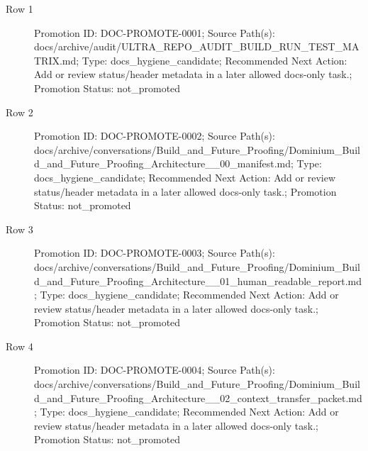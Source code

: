 \documentclass[9pt,a4paper,openany]{book}
\begin{document}
\begin{description}
\item[Row 1] Promotion ID: DOC-\allowbreak{}PROMOTE-\allowbreak{}0001; Source Path(s): docs/\allowbreak{}archive/\allowbreak{}audit/\allowbreak{}ULTRA\_\allowbreak{}REPO\_\allowbreak{}AUDIT\_\allowbreak{}BUILD\_\allowbreak{}RUN\_\allowbreak{}TEST\_\allowbreak{}MATRIX.\allowbreak{}md; Type: docs\_\allowbreak{}hygiene\_\allowbreak{}candidate; Recommended Next Action: Add or review status/\allowbreak{}header metadata in a later allowed docs-\allowbreak{}only task.\allowbreak{}; Promotion Status: not\_\allowbreak{}promoted
\item[Row 2] Promotion ID: DOC-\allowbreak{}PROMOTE-\allowbreak{}0002; Source Path(s): docs/\allowbreak{}archive/\allowbreak{}conversations/\allowbreak{}Build\_\allowbreak{}and\_\allowbreak{}Future\_\allowbreak{}Proofing/\allowbreak{}Dominium\_\allowbreak{}Build\_\allowbreak{}and\_\allowbreak{}Future\_\allowbreak{}Proofing\_\allowbreak{}Architecture\_\allowbreak{}\_\allowbreak{}00\_\allowbreak{}manifest.\allowbreak{}md; Type: docs\_\allowbreak{}hygiene\_\allowbreak{}candidate; Recommended Next Action: Add or review status/\allowbreak{}header metadata in a later allowed docs-\allowbreak{}only task.\allowbreak{}; Promotion Status: not\_\allowbreak{}promoted
\item[Row 3] Promotion ID: DOC-\allowbreak{}PROMOTE-\allowbreak{}0003; Source Path(s): docs/\allowbreak{}archive/\allowbreak{}conversations/\allowbreak{}Build\_\allowbreak{}and\_\allowbreak{}Future\_\allowbreak{}Proofing/\allowbreak{}Dominium\_\allowbreak{}Build\_\allowbreak{}and\_\allowbreak{}Future\_\allowbreak{}Proofing\_\allowbreak{}Architecture\_\allowbreak{}\_\allowbreak{}01\_\allowbreak{}human\_\allowbreak{}readable\_\allowbreak{}report.\allowbreak{}md; Type: docs\_\allowbreak{}hygiene\_\allowbreak{}candidate; Recommended Next Action: Add or review status/\allowbreak{}header metadata in a later allowed docs-\allowbreak{}only task.\allowbreak{}; Promotion Status: not\_\allowbreak{}promoted
\item[Row 4] Promotion ID: DOC-\allowbreak{}PROMOTE-\allowbreak{}0004; Source Path(s): docs/\allowbreak{}archive/\allowbreak{}conversations/\allowbreak{}Build\_\allowbreak{}and\_\allowbreak{}Future\_\allowbreak{}Proofing/\allowbreak{}Dominium\_\allowbreak{}Build\_\allowbreak{}and\_\allowbreak{}Future\_\allowbreak{}Proofing\_\allowbreak{}Architecture\_\allowbreak{}\_\allowbreak{}02\_\allowbreak{}context\_\allowbreak{}transfer\_\allowbreak{}packet.\allowbreak{}md; Type: docs\_\allowbreak{}hygiene\_\allowbreak{}candidate; Recommended Next Action: Add or review status/\allowbreak{}header metadata in a later allowed docs-\allowbreak{}only task.\allowbreak{}; Promotion Status: not\_\allowbreak{}promoted

\end{description}
\end{document}
